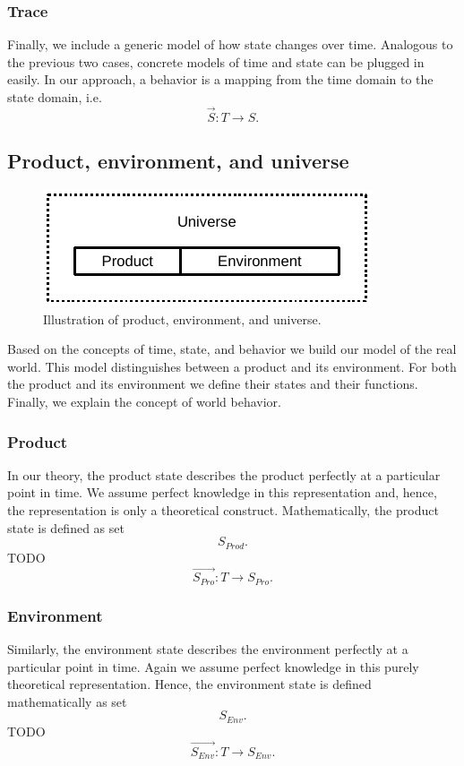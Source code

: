 \documentclass[conference]{IEEEtran}
\begin{document}
    \subsubsection{Trace}
    Finally, we include a generic model of how state changes over time.
    Analogous to the previous two cases, concrete models of time and state can be plugged in easily.
    In our approach, a behavior is a mapping from the time domain to the state domain, i.e.
    \[
        \overrightarrow{S}: T \rightarrow S.
    \]

    \subsection{Product, environment, and universe}
    \label{section:theory-universe}

    \begin{figure}[htbp]
        \centering
        \includegraphics{figures/theory-universe.pdf}
        \caption{Illustration of product, environment, and universe.}
        \label{figure:theory-universe}
    \end{figure}

    Based on the concepts of time, state, and behavior we build our model of the real world.
    This model distinguishes between a product and its environment.
    For both the product and its environment we define their states and their functions.
    Finally, we explain the concept of world behavior.

    \subsubsection{Product}
    In our theory, the product state describes the product perfectly at a particular point in time.
    We assume perfect knowledge in this representation and, hence, the representation is only a theoretical construct.
    Mathematically, the product state is defined as set
    \[
        S_{Prod}.
    \]
    TODO
    \[
        \overrightarrow{S_{Pro}}: T \rightarrow S_{Pro}.
    \]

    \subsubsection{Environment}
    Similarly, the environment state describes the environment perfectly at a particular point in time.
    Again we assume perfect knowledge in this purely theoretical representation.
    Hence, the environment state is defined mathematically as set
    \[
        S_{Env}.
    \]
    TODO
    \[
        \overrightarrow{S_{Env}}: T \rightarrow S_{Env}.
    \]
\end{document}
